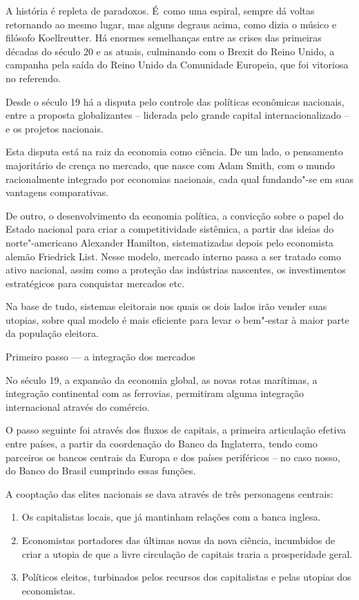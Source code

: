  

A história é repleta de paradoxos. É~como uma espiral, sempre dá voltas
retornando ao mesmo lugar, mas alguns degraus acima, como dizia o músico
e filósofo Koellreutter. Há enormes semelhanças entre as crises das
primeiras décadas do século 20 e as atuais, culminando com o Brexit do
Reino Unido, a campanha pela saída do Reino Unido da Comunidade
Europeia, que foi vitoriosa no referendo.

Desde o século 19 há a disputa pelo controle das políticas econômicas
nacionais, entre a proposta globalizantes -- liderada pelo grande
capital internacionalizado -- e os projetos nacionais.

Esta disputa está na raiz da economia como ciência. De um lado, o
pensamento majoritário de crença no mercado, que nasce com Adam Smith,
com o mundo racionalmente integrado por economias nacionais, cada qual
fundando"-se em suas vantagens comparativas.

De outro, o desenvolvimento da economia política, a convicção sobre o
papel do Estado nacional para criar a competitividade sistêmica, a
partir das ideias do norte"-americano Alexander Hamilton, sistematizadas
depois pelo economista alemão Friedrick List. Nesse modelo, mercado
interno passa a ser tratado como ativo nacional, assim como a proteção
das indústrias nascentes, os investimentos estratégicos para conquistar
mercados etc.

Na base de tudo, sistemas eleitorais nos quais os dois lados irão vender
suas utopias, sobre qual modelo é mais eficiente para levar o bem"-estar
à maior parte da população eleitora.

 Primeiro passo --- a integração dos mercados

No século 19, a expansão da economia global, as novas rotas marítimas, a
integração continental com as ferrovias, permitiram alguma integração
internacional através do comércio.

O passo seguinte foi através dos fluxos de capitais, a primeira
articulação efetiva entre países, a partir da coordenação do Banco da
Inglaterra, tendo como parceiros os bancos centrais da Europa e dos
países periféricos -- no caso nosso, do Banco do Brasil cumprindo essas
funções.

A cooptação das elites nacionais se dava através de três personagens
centrais:

\begin{enumerate}
\itemsep1pt\parskip0pt
\item
  Os capitalistas locais, que já mantinham relações com a banca inglesa.
\item
  Economistas portadores das últimas novas da nova ciência, incumbidos
  de criar a utopia de que a livre circulação de capitais traria a
  prosperidade geral.
\item
  Políticos eleitos, turbinados pelos recursos dos capitalistas e pelas
  utopias dos economistas.
\end{enumerate}

